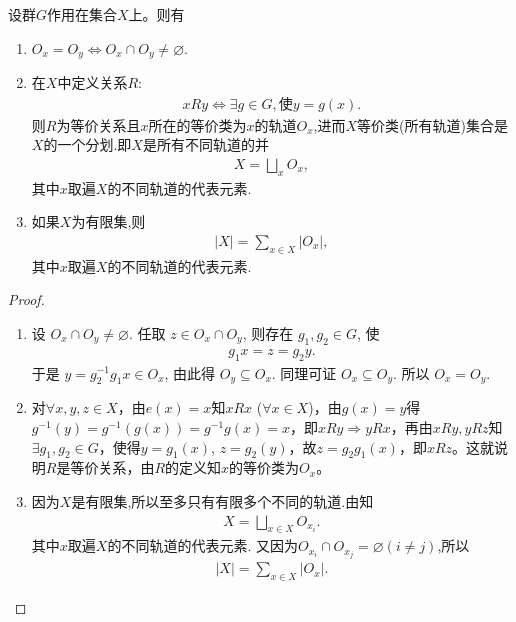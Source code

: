 \documentclass[../../main.tex]{subfiles}%
\begin{document}
\begin{theorem}\label{theorem:抽象代数--定理4.2.2}
设群$G$作用在集合$X$上。则有
\begin{enumerate}[(1)]
\item\label{theorem:抽象代数--定理4.2.2-0} $O_x=O_y\iff O_x\cap O_y\neq \varnothing .$

\item\label{theorem:抽象代数--定理4.2.2-1} 在$X$中定义关系$R$:
\begin{align*}
xRy\iff \exists g \in G, \text{使}y = g(x).
\end{align*}
则$R$为等价关系且$x$所在的等价类为$x$的轨道$O_x$,进而$X$等价类(所有轨道)集合是$X$的一个分划.即$X$是所有不同轨道的并
\begin{align*}
X=\bigsqcup_x O_x,
\end{align*}
其中$x$取遍$X$的不同轨道的代表元素.

\item\label{theorem:抽象代数--定理4.2.2-2} 如果$X$为有限集,则
\begin{align*}
|X|=\sum_{x\in X}|O_{x}|,
\end{align*}
其中$x$取遍$X$的不同轨道的代表元素.
\end{enumerate}
\end{theorem}
\begin{proof}
\begin{enumerate}[(1)]
\item 设 $O_x \cap O_y \neq \varnothing$. 任取 $z \in O_x \cap O_y$, 则存在 $g_1,g_2 \in G$, 使
\begin{align*}
g_1x = z = g_2y.
\end{align*}
于是 $y = g_2^{-1}g_1x \in O_x$, 由此得 $O_y \subseteq O_x$. 同理可证 $O_x \subseteq O_y$. 所以 $O_x = O_y$.


\item 对$\forall x, y, z \in X$，由$e(x) = x$知$xRx$ ($\forall x \in X$)，由$g(x) = y$得$g^{-1}(y) = g^{-1}(g(x)) =g^{-1}g(x)= x$，即$xRy \Rightarrow yRx$，再由$xRy, yRz$知$\exists g_1, g_2 \in G$，使得$y = g_1(x)$, $z = g_2(y)$，故$z = g_2g_1(x)$，即$xRz$。这就说明$R$是等价关系，由$R$的定义知$x$的等价类为$O_x$。

\item 因为$X$是有限集,所以至多只有有限多个不同的轨道.由知
\begin{align*}
X = \bigsqcup_{x\in X}O_{x_i}.
\end{align*}
其中$x$取遍$X$的不同轨道的代表元素.
又因为$O_{x_i}\cap O_{x_j}=\varnothing (i\neq j)$,所以
\begin{align*}
|X|=\sum_{x\in X}|O_{x}|.
\end{align*}
\end{enumerate}

\end{proof}
\end{document}
